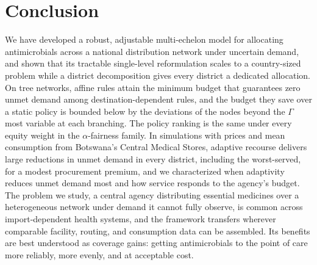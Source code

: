 \documentclass[11pt]{article}
\begin{document}
\section{Conclusion}
\label{sec:conclusion}

We have developed a robust, adjustable multi-echelon model for allocating antimicrobials across a national distribution network under uncertain demand, and shown that its tractable single-level reformulation scales to a country-sized problem while a district decomposition gives every district a dedicated allocation.
On tree networks, affine rules attain the minimum budget that guarantees zero unmet demand among destination-dependent rules, and the budget they save over a static policy is bounded below by the deviations of the nodes beyond the $\Gamma$ most variable at each branching.
The policy ranking is the same under every equity weight in the $\alpha$-fairness family.
In simulations with prices and mean consumption from Botswana's Central Medical Stores, adaptive recourse delivers large reductions in unmet demand in every district, including the worst-served, for a modest procurement premium, and we characterized when adaptivity reduces unmet demand most and how service responds to the agency's budget.
The problem we study, a central agency distributing essential medicines over a heterogeneous network under demand it cannot fully observe, is common across import-dependent health systems, and the framework transfers wherever comparable facility, routing, and consumption data can be assembled.
Its benefits are best understood as coverage gains: getting antimicrobials to the point of care more reliably, more evenly, and at acceptable cost.


\end{document}
